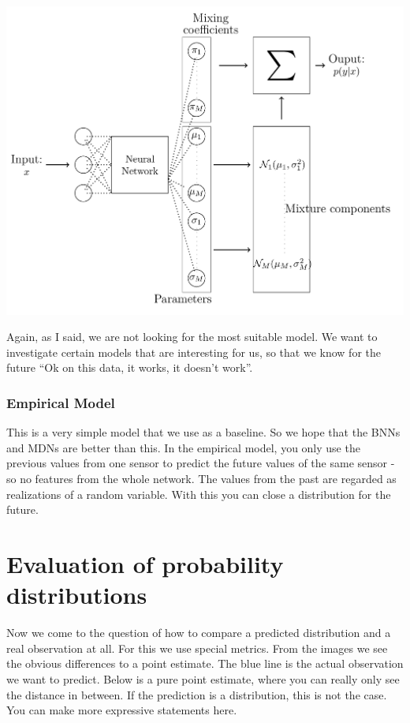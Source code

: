 \documentclass[margin=0.01in]{article}
\begin{document}
\begin{center}
\includegraphics[width=.9\linewidth]{../images/mdn.png}
\end{center}

Again, as I said, we are not looking for the most suitable model. We want to investigate certain models that are interesting for us, so that we know for the future ``Ok on this data, it works, it doesn't work''.

\subsubsection{Empirical Model}
\label{sec:orgaac79b6}
This is a very simple model that we use as a baseline. So we hope that the BNNs and MDNs are better than this. In the empirical model, you only use the previous values from one sensor to predict the future values of the same sensor - so no features from the whole network. The values from the past are regarded as realizations of a random variable. With this you can close a distribution for the future.

\section{Evaluation of probability distributions}
\label{sec:org282e95f}
Now we come to the question of how to compare a predicted distribution and a real observation at all. For this we use special metrics. From the images we see the obvious differences to a point estimate. The blue line is the actual observation we want to predict. Below is a pure point estimate, where you can really only see the distance in between. If the prediction is a distribution, this is not the case. You can make more expressive statements here.
\end{document}
